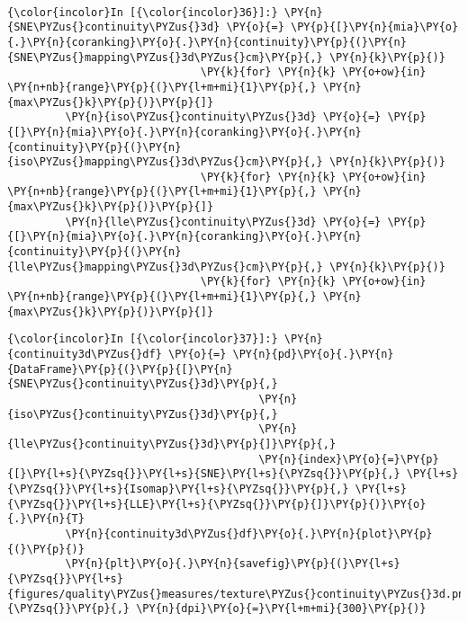     \begin{center}
    \end{center}
    { \hspace*{\fill} \\}

    \begin{Verbatim}[commandchars=\\\{\}]
{\color{incolor}In [{\color{incolor}36}]:} \PY{n}{SNE\PYZus{}continuity\PYZus{}3d} \PY{o}{=} \PY{p}{[}\PY{n}{mia}\PY{o}{.}\PY{n}{coranking}\PY{o}{.}\PY{n}{continuity}\PY{p}{(}\PY{n}{SNE\PYZus{}mapping\PYZus{}3d\PYZus{}cm}\PY{p}{,} \PY{n}{k}\PY{p}{)}
                              \PY{k}{for} \PY{n}{k} \PY{o+ow}{in} \PY{n+nb}{range}\PY{p}{(}\PY{l+m+mi}{1}\PY{p}{,} \PY{n}{max\PYZus{}k}\PY{p}{)}\PY{p}{]}
         \PY{n}{iso\PYZus{}continuity\PYZus{}3d} \PY{o}{=} \PY{p}{[}\PY{n}{mia}\PY{o}{.}\PY{n}{coranking}\PY{o}{.}\PY{n}{continuity}\PY{p}{(}\PY{n}{iso\PYZus{}mapping\PYZus{}3d\PYZus{}cm}\PY{p}{,} \PY{n}{k}\PY{p}{)}
                              \PY{k}{for} \PY{n}{k} \PY{o+ow}{in} \PY{n+nb}{range}\PY{p}{(}\PY{l+m+mi}{1}\PY{p}{,} \PY{n}{max\PYZus{}k}\PY{p}{)}\PY{p}{]}
         \PY{n}{lle\PYZus{}continuity\PYZus{}3d} \PY{o}{=} \PY{p}{[}\PY{n}{mia}\PY{o}{.}\PY{n}{coranking}\PY{o}{.}\PY{n}{continuity}\PY{p}{(}\PY{n}{lle\PYZus{}mapping\PYZus{}3d\PYZus{}cm}\PY{p}{,} \PY{n}{k}\PY{p}{)}
                              \PY{k}{for} \PY{n}{k} \PY{o+ow}{in} \PY{n+nb}{range}\PY{p}{(}\PY{l+m+mi}{1}\PY{p}{,} \PY{n}{max\PYZus{}k}\PY{p}{)}\PY{p}{]}
\end{Verbatim}

    \begin{Verbatim}[commandchars=\\\{\}]
{\color{incolor}In [{\color{incolor}37}]:} \PY{n}{continuity3d\PYZus{}df} \PY{o}{=} \PY{n}{pd}\PY{o}{.}\PY{n}{DataFrame}\PY{p}{(}\PY{p}{[}\PY{n}{SNE\PYZus{}continuity\PYZus{}3d}\PY{p}{,}
                                       \PY{n}{iso\PYZus{}continuity\PYZus{}3d}\PY{p}{,}
                                       \PY{n}{lle\PYZus{}continuity\PYZus{}3d}\PY{p}{]}\PY{p}{,}
                                       \PY{n}{index}\PY{o}{=}\PY{p}{[}\PY{l+s}{\PYZsq{}}\PY{l+s}{SNE}\PY{l+s}{\PYZsq{}}\PY{p}{,} \PY{l+s}{\PYZsq{}}\PY{l+s}{Isomap}\PY{l+s}{\PYZsq{}}\PY{p}{,} \PY{l+s}{\PYZsq{}}\PY{l+s}{LLE}\PY{l+s}{\PYZsq{}}\PY{p}{]}\PY{p}{)}\PY{o}{.}\PY{n}{T}
         \PY{n}{continuity3d\PYZus{}df}\PY{o}{.}\PY{n}{plot}\PY{p}{(}\PY{p}{)}
         \PY{n}{plt}\PY{o}{.}\PY{n}{savefig}\PY{p}{(}\PY{l+s}{\PYZsq{}}\PY{l+s}{figures/quality\PYZus{}measures/texture\PYZus{}continuity\PYZus{}3d.png}\PY{l+s}{\PYZsq{}}\PY{p}{,} \PY{n}{dpi}\PY{o}{=}\PY{l+m+mi}{300}\PY{p}{)}
\end{Verbatim}

